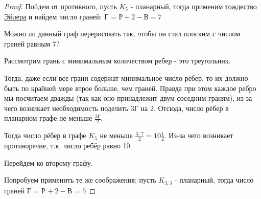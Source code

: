 \documentclass[russian]{lecture-notes}
\begin{document}
\begin{proof}
    Пойдем от противного, пусть $K_5$ - планарный, тогда применим \hyperref[eq:tojdEylera]{тождество Эйлера} и найдем число граней:
$\text{Г = Р} + 2 - \text{В} = 7$

Можно ли данный граф перерисовать так, чтобы он стал плоским с числом граней равным 7?

Рассмотрим грань с минимальным количеством ребер - это треугольник.

\begin{figure}[H]
    \centering
\end{figure}

Тогда, даже если все грани содержат минимальное число рёбер, то их должно быть по крайней мере втрое больше, чем граней. Правда при этом каждое ребро мы посчитаем дважды (так как оно принадлежит двум соседним граням), из-за чего возникает необходимость поделить 3Г на 2. Отсюда, число рёбер в планарном графе не меньше $\frac{3\text{Г}}{2}$.

\begin{figure}[H]
    \centering
\end{figure}

Тогда число рёбер в графе $K_5$ не меньше $\frac{3 \cdot 7}{2} = 10\frac{1}{2}$. Из-за чего возникает противоречие, т.к. число ребёр равно 10.

Перейдем ко второму графу.

Попробуем применить те же соображения:  пусть $K_{3,3}$ - планарный, тогда число граней $\text{Г = Р +} \ 2 - \text{В = } 5$


\end{proof}
\end{document}
